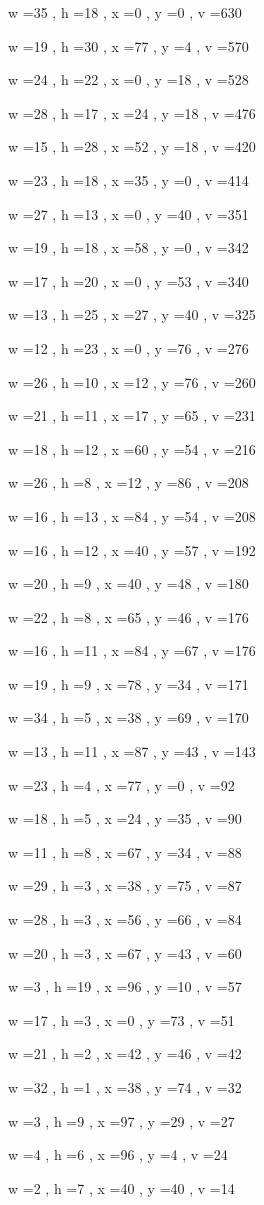\documentclass[11pt]{article}
\begin{document}
w =35 , h =18 , x =0 , y =0 , v =630
\par
w =19 , h =30 , x =77 , y =4 , v =570
\par
w =24 , h =22 , x =0 , y =18 , v =528
\par
w =28 , h =17 , x =24 , y =18 , v =476
\par
w =15 , h =28 , x =52 , y =18 , v =420
\par
w =23 , h =18 , x =35 , y =0 , v =414
\par
w =27 , h =13 , x =0 , y =40 , v =351
\par
w =19 , h =18 , x =58 , y =0 , v =342
\par
w =17 , h =20 , x =0 , y =53 , v =340
\par
w =13 , h =25 , x =27 , y =40 , v =325
\par
w =12 , h =23 , x =0 , y =76 , v =276
\par
w =26 , h =10 , x =12 , y =76 , v =260
\par
w =21 , h =11 , x =17 , y =65 , v =231
\par
w =18 , h =12 , x =60 , y =54 , v =216
\par
w =26 , h =8 , x =12 , y =86 , v =208
\par
w =16 , h =13 , x =84 , y =54 , v =208
\par
w =16 , h =12 , x =40 , y =57 , v =192
\par
w =20 , h =9 , x =40 , y =48 , v =180
\par
w =22 , h =8 , x =65 , y =46 , v =176
\par
w =16 , h =11 , x =84 , y =67 , v =176
\par
w =19 , h =9 , x =78 , y =34 , v =171
\par
w =34 , h =5 , x =38 , y =69 , v =170
\par
w =13 , h =11 , x =87 , y =43 , v =143
\par
w =23 , h =4 , x =77 , y =0 , v =92
\par
w =18 , h =5 , x =24 , y =35 , v =90
\par
w =11 , h =8 , x =67 , y =34 , v =88
\par
w =29 , h =3 , x =38 , y =75 , v =87
\par
w =28 , h =3 , x =56 , y =66 , v =84
\par
w =20 , h =3 , x =67 , y =43 , v =60
\par
w =3 , h =19 , x =96 , y =10 , v =57
\par
w =17 , h =3 , x =0 , y =73 , v =51
\par
w =21 , h =2 , x =42 , y =46 , v =42
\par
w =32 , h =1 , x =38 , y =74 , v =32
\par
w =3 , h =9 , x =97 , y =29 , v =27
\par
w =4 , h =6 , x =96 , y =4 , v =24
\par
w =2 , h =7 , x =40 , y =40 , v =14
\par
\newpage
\end{document}

